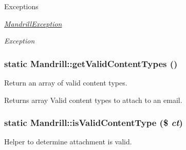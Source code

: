 \begin{DoxyExceptions}{Exceptions}
\item[{\em \hyperlink{classMandrillException}{MandrillException}}]\item[{\em Exception}]\end{DoxyExceptions}
\hypertarget{classMandrill_aa3462b61a5d844683f4fdf0f0068869f}{
\subsubsection[{getValidContentTypes}]{\setlength{\rightskip}{0pt plus 5cm}static Mandrill::getValidContentTypes ()}}
\label{classMandrill_aa3462b61a5d844683f4fdf0f0068869f}
Return an array of valid content types.

\begin{DoxyReturn}{Returns}
array Valid content types to attach to an email. 
\end{DoxyReturn}
\hypertarget{classMandrill_a8a6b67834236ab37ad0e5c83b7bd2695}{
\subsubsection[{isValidContentType}]{\setlength{\rightskip}{0pt plus 5cm}static Mandrill::isValidContentType (\$ {\em ct})}}
\label{classMandrill_a8a6b67834236ab37ad0e5c83b7bd2695}
Helper to determine attachment is valid.


